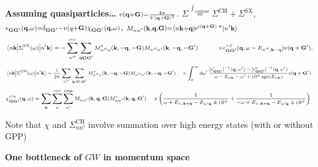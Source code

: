 \documentclass[t]{beamer}
\DeclareMathOperator{\ee}{e}
\DeclareMathOperator{\ii}{i}
\DeclareMathOperator{\sgn}{sgn}
\def\\{}%
\begin{document}
\begin{frame}[allowframebreaks]
\textbf{Assuming quasiparticles\dots} 
$\scriptstyle v(\vb{q} + \vb{G}) = \frac{4\pi }{V \abs*{\vb{q} + \vb{G}}^2}$.
$\scriptstyle \Sigma \stackrel{\int_{\text{contour}}}{=} \Sigma^{\text{CH}} + \Sigma^{\text{SX}}$,
$\scriptstyle \epsilon_{\vb{G} \vb{G}'}(\vb{q}, \omega) = \delta_{\vb{G} \vb{G}'} - v(q + \vb{G}) \chi_{\vb{G} \vb{G}'}(\vb{q}, \omega)$, 
$\scriptstyle M_{n n'}(\vb{k}, \vb{q}, \vb{G}) = \mel*{n \vb{k} + \vb{q}}{\ee^{\ii (\vb{q} + \vb{G}) \cdot \vb{r}}}{n' \vb{k}}$
\begin{equation*}
    \scriptsize
    \begin{aligned}
    \mel{n \vb{k}}{\Sigma^{\text{SX}}(\omega)}{n' \vb{k}} 
    &= - \sum_{n''}^{\text{occ}} \sum_{\vb{q} \vb{G} \vb{G}'}
    M^*_{n'' n} (\vb{k}, - \vb{q}, - \vb{G}) M_{n'' n'} (\vb{k}, - \vb{q},  -\vb{G}') \\
    &\quad\quad \times  \epsilon^{-1}_{\vb{G} \vb{G}'}(\vb{q}, \omega - E_{n'', \vb{k} - \vb{q}}) 
    v(\vb{q} + \vb{G}') ,
    \end{aligned}
    \label{eq:sex}
\end{equation*}
\begin{equation*}
    \scriptsize
    \begin{aligned}
        \mel{n \vb{k}}{\Sigma^{\text{CH}}(\omega)}{n' \vb{k}} 
        &= \frac{\ii}{2\pi} \sum_{n''} \sum_{\vb{q}, \vb{G}, \vb{G}'} 
        M^*_{n'' n} (\vb{k}, - \vb{q}, - \vb{G})  M_{n'' n'} (\vb{k}, - \vb{q},  -\vb{G}') \\
        & \times \int_{0}^{\infty} \dd{\omega'} 
        \frac{
            [\epsilon^{\text{r}}_{\vb{G} \vb{G}'}]^{-1} (\vb{q}, \omega')
            - [\epsilon^{\text{a}}_{\vb{G} \vb{G}'}]^{-1} (\vb{q}, \omega') 
        }{\omega - E_{n \vb{k}} - \omega' + \ii 0^+ \sgn(E_{n \vb{k}})} v(\vb{q}+\vb{G}') .
    \end{aligned}
    \label{eq:coh}
\end{equation*}
\begin{equation*}
    \scriptsize
    \begin{aligned}
        \chi^{\text{r/a}}_{\vb{G} \vb{G}'}(\vb{q}, \omega)
        &= \sum_{\vb{k}} \sum_{n}^{\text{occ}} \sum_{n'}^{\text{emp}} 
        M_{n n'} (\vb{k}, \vb{q}, \vb{G}) M^*_{nn'} (\vb{k}, \vb{q}, \vb{G}') \\
        &\times \left(
        \frac{
            1
        }{
            \omega + E_{n, \vb{k} + \vb{q}} - E_{n' \vb{k}} \pm \ii 0^+
        }
        + \frac{
            1
        }{
            - \omega + E_{n, \vb{k} + \vb{q}} - E_{n' \vb{k}} \mp \ii 0^+
        }
        \right).
    \end{aligned}
    \label{eq:chi}
\end{equation*}

Note that $\chi$ and $\Sigma_{nn'}^{\text{CH}}$ involve summation over high energy states 
(with or without GPP)

\textbf{One bottleneck of $GW$ in momentum space}

\end{frame}
\end{document}
